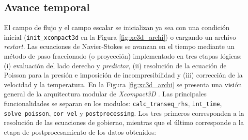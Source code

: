 \subsection{Avance temporal} \label{sec:time-ava}

El campo de flujo y el campo escalar se inicializan ya sea con una condición inicial (\texttt{init\_xcompact3d} en la Figura \ref{fig:xc3d_archi}) o cargando un archivo \textit{restart}. Las ecuaciones de Navier-Stokes se avanzan en el tiempo mediante un método de paso fraccionado (o proyección) implementado en tres etapas lógicas: (i) evaluación del lado derecho y \textit{predictor}, (ii) resolución de la ecuación de Poisson para la presión  e imposición de incompresibilidad y (iii) corrección de la velocidad y la temperatura.  En la Figura \ref{fig:xc3d_archi} se presenta una visión general de la arquitectura modular de \textit{Xcompact3D} \cite{bartholomew2020xcompact3d}. Las principales funcionalidades se separan en los modulos: \texttt{calc\_transeq\_rhs}, \texttt{int\_time}, \texttt{solve\_poisson}, \texttt{cor\_vel} y \texttt{postprocessing}. Los tres primeros corresponden a la resolución de las ecuaciones de gobierno, mientras que el último corresponde a la etapa de postprocesamiento de los datos obtenidos:



